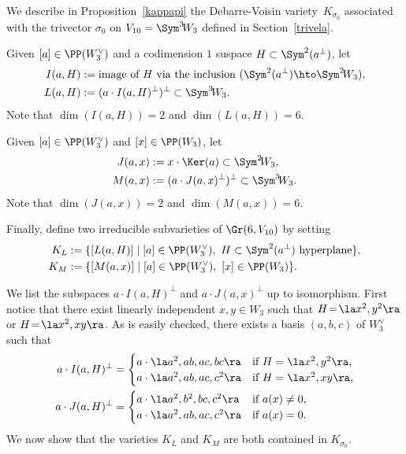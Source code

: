 We describe in Proposition~\ref{kappapi} the Debarre-Voisin variety~$K_{\sigma_0}$ associated with the trivector $\sigma_0 $ on $V_{10}=\Sym^3 \!W_3 $ defined in Section~\ref{trivela}.


\skpt
\begin{defi}\label{eccolph}
\begin{enumeratea}
\item\label{eccolpha}
Given $[a]\in \PP(W_{3}^{\vee})$ and a codimension $1$ suspace $H\subset\Sym^2(a^{\bot})$, let
\begin{align*}
I(a,H) & := \textnormal{image of $H$ via the inclusion $(\Sym^2(a^{\bot})\hto \Sym^2\! W_{3})$,} \\
L(a,H) & := (a\cdot I(a,H)^{\bot})^{\bot}\subset \Sym^3\! W_{3}.
\end{align*}
Note that $\dim (I(a,H))=2$ and $\dim (L(a,H))=6$.

\item\label{eccolphb}
Given $[a]\in \PP(W_{3}^{\vee})$ and
$[x]\in \PP (W_3)$, let
\begin{align*}
J(a,x) & := x\cdot \Ker(a) \subset \Sym^2\! W_{3}, \\
M(a,x) & := (a\cdot J(a,x)^{\bot})^{\bot}\subset \Sym^3\! W_{3}.
\end{align*}
Note that $\dim (J(a,x))=2$ and $\dim (M(a,x))=6$.

\item\label{eccolphc}
Finally, define two irreducible subvarieties of $ \Gr(6,V_{10})$ by setting
\begin{align*}
K_L & := \{[L(a,H)] \mid [a]\in \PP(W_3^{\vee}),\ H \subset \Sym^2(a^{\bot})\textnormal{ hyperplane}\},\\
K_M & := \{[M(a,x)] \mid [a]\in \PP (W_3^{\vee}),\ [x]\in \PP (W_3)\}.
\end{align*}
\end{enumeratea}
\end{defi}
We list the subspaces $a\cdot I(a,H)^{\bot}$ and $a\cdot J(a,x)^{\bot}$ up to isomorphism. First notice that there exist linearly independent $x,y\!\in\!W_3$ such that $H\!=\!\la x^2,y^2\ra$ or \hbox{$H\!=\!\la x^2,xy\ra$}.
As is easily checked, there exists a basis $(a,b,c)$ of $W_3^{\vee}$ such that
\begin{equation}\label{esplicito}
\begin{aligned}
a\cdot I(a,H)^{\bot}&=
\begin{cases}
a\cdot\la a^2,ab,ac,bc\ra & \text{if $H=\la x^2,y^2\ra$,} \\
a\cdot\la a^2,ab,ac,c^2\ra & \text{if $H=\la x^2,xy\ra$,}
\end{cases}
\\
a\cdot J(a,H)^{\bot}&=
\begin{cases}
a\cdot\la a^2,b^2,bc,c^2\ra & \text{if $a(x)\not=0$,} \\
a\cdot\la a^2,ab,ac,c^2\ra & \text{if $a(x)=0$.}
\end{cases}
\end{aligned}
\end{equation}
We now show that the varieties $K_L$ and $K_M$ are both contained in $K_{\sigma_0}$.

